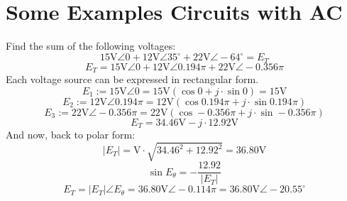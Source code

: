 \documentclass{article}
\begin{document}
	\section[Examples]{Some Examples Circuits with AC}
	Find the sum of the following voltages:
	$$ 15\text{V}\angle0 + 12\text{V}\angle35^{\circ} + 
	22\text{V}\angle-64^{\circ} = E_T$$
	$$ E_T = 15\text{V}\angle0 + 12\text{V}\angle0.194\pi + 
	22\text{V}\angle-0.356\pi$$
	Each voltage source can be expressed in rectangular form.
	$$ E_1 := 15\text{V}\angle0=15\text{V}(\cos0 + j\cdot\sin 0) = 15\text{V}$$
	$$ E_2 := 12\text{V}\angle0.194\pi = 12\text{V}(\cos 0.194\pi + j\cdot\sin 
	0.194\pi)$$
	$$ E_3:=22\text{V}\angle-0.356\pi = 22\text{V}(\cos-0.356\pi + 
	j\cdot\sin-0.356\pi)$$
	$$ E_T = 34.46\text{V} - j \cdot 12.92 \text{V} $$
	And now, back to polar form:
	$$ |E_T| = \text{V}\cdot\sqrt{34.46^2 + 12.92^2} = 36.80 \text{V}$$
	$$ \sin E_\theta = -\frac{12.92}{|E_T|}$$
	$$ E_T = |E_T|\angle E_\theta = 36.80\text{V}\angle-0.114\pi = 
	36.80\text{V}\angle-20.55^{\circ}$$
	
\end{document}
